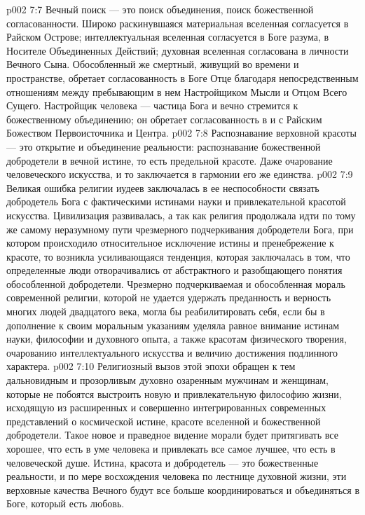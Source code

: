 \vs p002 7:7 \pc Вечный поиск --- это поиск объединения, поиск божественной согласованности. Широко раскинувшаяся материальная вселенная согласуется в Райском Острове; интеллектуальная вселенная согласуется в Боге разума, в Носителе Объединенных Действий; духовная вселенная согласована в личности Вечного Сына. Обособленный же смертный, живущий во времени и пространстве, обретает согласованность в Боге Отце благодаря непосредственным отношениям между пребывающим в нем Настройщиком Мысли и Отцом Всего Сущего. Настройщик человека --- частица Бога и вечно стремится к божественному объединению; он обретает согласованность в и с Райским Божеством Первоисточника и Центра.
\vs p002 7:8 \pc Распознавание верховной красоты --- это открытие и объединение реальности: распознавание божественной добродетели в вечной истине, то есть предельной красоте. Даже очарование человеческого искусства, и то заключается в гармонии его же единства.
\vs p002 7:9 Великая ошибка религии иудеев заключалась в ее неспособности связать добродетель Бога с фактическими истинами науки и привлекательной красотой искусства. Цивилизация развивалась, а так как религия продолжала идти по тому же самому неразумному пути чрезмерного подчеркивания добродетели Бога, при котором происходило относительное исключение истины и пренебрежение к красоте, то возникла усиливающаяся тенденция, которая заключалась в том, что определенные люди отворачивались от абстрактного и разобщающего понятия обособленной добродетели. Чрезмерно подчеркиваемая и обособленная мораль современной религии, которой не удается удержать преданность и верность многих людей двадцатого века, могла бы реабилитировать себя, если бы в дополнение к своим моральным указаниям уделяла равное внимание истинам науки, философии и духовного опыта, а также красотам физического творения, очарованию интеллектуального искусства и величию достижения подлинного характера.
\vs p002 7:10 Религиозный вызов этой эпохи обращен к тем дальновидным и прозорливым духовно озаренным мужчинам и женщинам, которые не побоятся выстроить новую и привлекательную философию жизни, исходящую из расширенных и совершенно интегрированных современных представлений о космической истине, красоте вселенной и божественной добродетели. Такое новое и праведное видение морали будет притягивать все хорошее, что есть в уме человека и привлекать все самое лучшее, что есть в человеческой душе. Истина, красота и добродетель --- это божественные реальности, и по мере восхождения человека по лестнице духовной жизни, эти верховные качества Вечного будут все больше координироваться и объединяться в Боге, который есть любовь.
